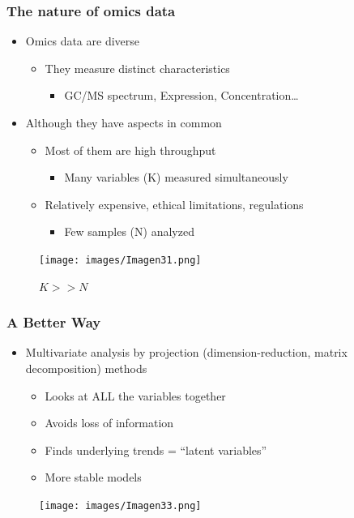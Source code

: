 \documentclass{beamer}
\begin{document}
\begin{frame}
	\frametitle{The nature of omics data}
	\begin{itemize}
		\item Omics data are diverse
		\begin{itemize}
			\item They measure distinct characteristics
			\begin{itemize}
				\item GC/MS spectrum, Expression, Concentration…
			\end{itemize}
		\end{itemize}
		\item Although they have aspects in common
		\begin{itemize}
			\item Most of them are high throughput
			\begin{itemize}
				\item Many variables (K) measured simultaneously
			\end{itemize}
			\item Relatively expensive, ethical limitations, regulations
			\begin{itemize}
				\item Few samples (N) analyzed 
			\end{itemize}
		\end{itemize}
	\end{itemize}
	\begin{figure}[ht]
		\centering
		\texttt{[image: images/Imagen31.png]}
		\caption{$K >> N$}
	\end{figure} 
\end{frame}

\begin{frame}
	\frametitle{A Better Way}
	\begin{itemize}
		\item Multivariate analysis by projection (dimension-reduction, matrix decomposition) methods
		\begin{itemize}
			\item Looks at ALL the variables together
			\item Avoids loss of information
			\item Finds underlying trends = ``latent variables''
			\item More stable models
		\end{itemize}
	\end{itemize}
	\begin{figure}[ht]
		\centering
		\texttt{[image: images/Imagen33.png]}
	\end{figure}
\end{frame}
\end{document}

